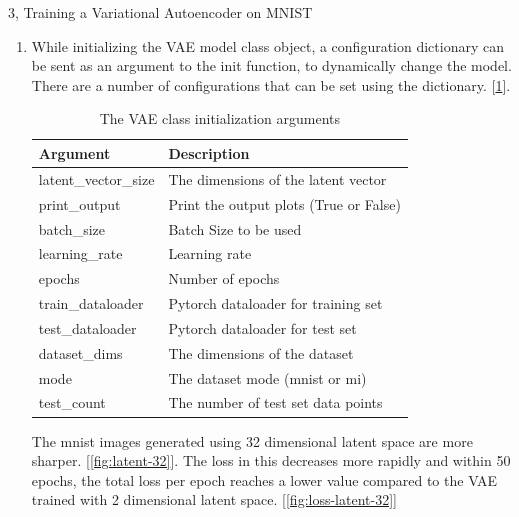 \documentclass[10pt,a4paper]{article}
\begin{document}
\begin{task}{3, Training a Variational Autoencoder on MNIST}
\begin{enumerate}
	\item While initializing the VAE model class object, a configuration dictionary can be sent as an argument to the init function, to dynamically change the model. There are a number of configurations that can be set using the dictionary. [\ref{tab:configs_options}].
	
\begin {table}[H]
\caption {The VAE class initialization arguments} \label{tab:configs_options} 
\begin{center}
\begin{tabular}{ | m{10em} | m{20em}| } 
\hline
Argument & Description \\ 
\hline \hline
latent\_vector\_size & The dimensions of the latent vector \\ 
\hline
print\_output & Print the output plots (True or False) \\
\hline
batch\_size & Batch Size to be used \\
\hline
learning\_rate & Learning rate \\
\hline
epochs & Number of epochs\\
\hline
train\_dataloader & Pytorch dataloader for training set \\
\hline
test\_dataloader & Pytorch dataloader for test set \\
\hline
dataset\_dims & The dimensions of the dataset \\
\hline
mode & The dataset mode (mnist or mi) \\
\hline
test\_count & The number of test set data points \\
\hline
\end{tabular}
\end{center}
\end{table}

The mnist images generated using 32 dimensional latent space are more sharper. [\ref{fig:latent-32}]. The loss in this decreases more rapidly and within 50 epochs, the total loss per epoch reaches a lower value compared to the VAE trained with 2 dimensional latent space. [\ref{fig:loss-latent-32}]


\end{enumerate}
\end{task}
\end{document}
